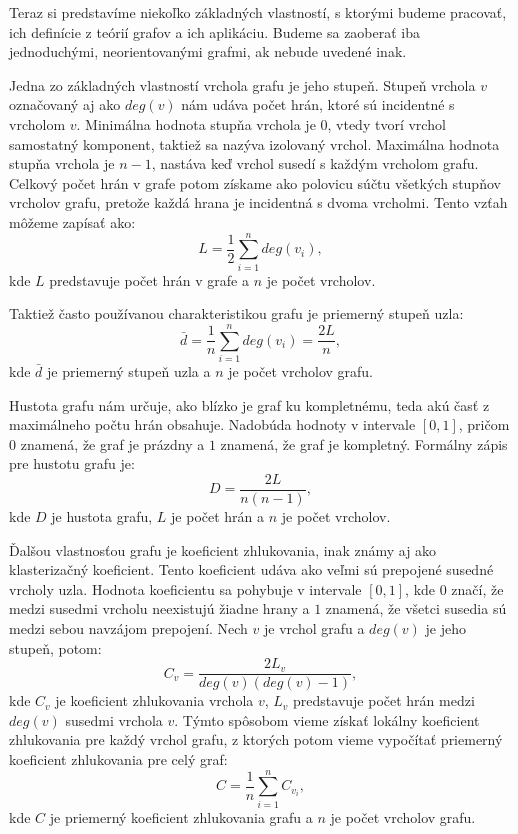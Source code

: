 Teraz si predstavíme niekoľko základných vlastností, s ktorými budeme pracovať, ich definície z teórií grafov a ich aplikáciu. Budeme sa zaoberať iba
jednoduchými, neorientovanými grafmi, ak nebude uvedené inak.

Jedna zo základných vlastností vrchola grafu je jeho stupeň. Stupeň vrchola $v$ označovaný aj ako $deg(v)$ nám udáva počet hrán,
ktoré sú incidentné s vrcholom $v$. Minimálna hodnota stupňa vrchola je $0$, vtedy tvorí vrchol samostatný komponent, taktiež sa
nazýva izolovaný vrchol. Maximálna hodnota stupňa vrchola je $n-1$, nastáva keď vrchol susedí s každým vrcholom grafu.
Celkový počet hrán v grafe potom získame ako polovicu súčtu všetkých stupňov vrcholov grafu,
pretože každá hrana je incidentná s dvoma vrcholmi. Tento vzťah môžeme zapísať ako:
\begin{equation}
    L = \frac{1}{2} \sum_{i=1}^{n} deg(v_i),
    \label{eq:pocet_hran}
\end{equation}
kde $L$ predstavuje počet hrán v grafe a $n$ je počet vrcholov\cite{barabasi2016network}.

Taktiež často používanou charakteristikou grafu je priemerný stupeň uzla:
\begin{equation}
    \bar{d} = \frac{1}{n} \sum_{i=1}^{n} deg(v_i) = \frac{2L}{n},
    \label{eq:priemerny_stupen}
\end{equation}
kde $\bar{d}$ je priemerný stupeň uzla a $n$ je počet vrcholov grafu\cite{barabasi2016network}.

Hustota grafu nám určuje, ako blízko je graf ku kompletnému, teda akú časť z maximálneho počtu hrán obsahuje.
Nadobúda hodnoty v intervale $[0, 1]$, pričom $0$ znamená, že graf je prázdny a $1$ znamená, že graf je kompletný.
Formálny zápis pre hustotu grafu je:
\begin{equation}
    D = \frac{2L}{n(n-1)},
    \label{eq:hustota}
\end{equation}
kde $D$ je hustota grafu, $L$ je počet hrán a $n$ je počet vrcholov.

Ďalšou vlastnosťou grafu je koeficient zhlukovania, inak známy aj ako klasterizačný koeficient.
Tento koeficient udáva ako veľmi sú prepojené susedné vrcholy uzla. Hodnota koeficientu sa pohybuje v intervale $[0, 1]$,
kde $0$ značí, že medzi susedmi vrcholu neexistujú žiadne hrany a $1$ znamená, že všetci susedia sú medzi sebou navzájom prepojení.
Nech $v$ je vrchol grafu a $deg(v)$ je jeho stupeň, potom:
\begin{equation}
    C_v = \frac{2L_v}{deg(v)(deg(v)-1)},
    \label{eq:koeficient_zhlukovania_local}
\end{equation}
kde $C_v$ je koeficient zhlukovania vrchola $v$, $L_v$ predstavuje počet hrán medzi $deg(v)$ susedmi vrchola $v$. 
Týmto spôsobom vieme získať lokálny koeficient zhlukovania pre každý vrchol grafu, z ktorých potom vieme vypočítať
priemerný koeficient zhlukovania pre celý graf:
\begin{equation}
    C = \frac{1}{n} \sum_{i=1}^{n} C_{v_i},
    \label{eq:koeficient_zhlukovania_global}
\end{equation}
kde $C$ je priemerný koeficient zhlukovania grafu a $n$ je počet vrcholov grafu\cite{barabasi2016network}.

